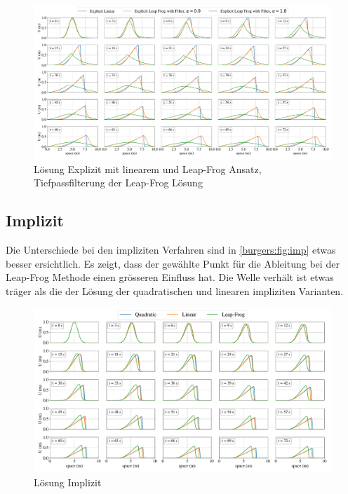 	  \begin{figure}
		\centering
		\includegraphics[width=1\textwidth]{papers/burgers/BurgersEquation/time_filter.pdf}
		\caption{L\"osung Explizit mit linearem und Leap-Frog Ansatz, Tiefpassfilterung der Leap-Frog L\"osung }
		\label{burgers:fig:time}
		\end{figure}


	\subsection{Implizit}

	Die Unterschiede bei den impliziten Verfahren sind in \autoref{burgers:fig:imp} etwas besser ersichtlich.
	Es zeigt, dass der gew\"ahlte Punkt f\"ur die Ableitung bei der Leap-Frog Methode einen gr\"osseren Einfluss hat.
	Die Welle verh\"alt ist etwas tr\"ager als die der L\"osung der quadratischen und linearen impliziten Varianten.

    \begin{figure}
	\centering
	\includegraphics[width=1\textwidth]{papers/burgers/BurgersEquation/imp_paper.pdf}
	\caption{L\"osung Implizit}
	\label{burgers:fig:imp}
	\end{figure}

